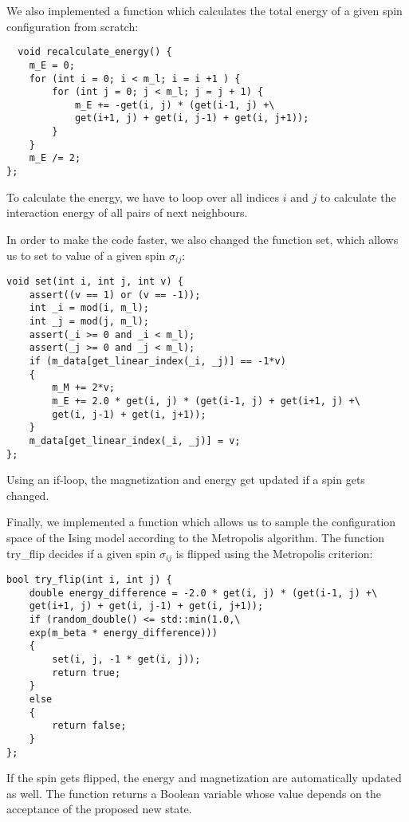 \documentclass[a4paper,10pt,bibtotoc]{scrartcl}
\begin{document}
We also implemented a function which calculates the total energy of a given spin configuration from scratch:
\begin{lstlisting}
  void recalculate_energy() {
    m_E = 0;
    for (int i = 0; i < m_l; i = i +1 ) {
        for (int j = 0; j < m_l; j = j + 1) {
            m_E += -get(i, j) * (get(i-1, j) +\
            get(i+1, j) + get(i, j-1) + get(i, j+1));
        }
    }
    m_E /= 2;
};
\end{lstlisting}
To calculate the energy, we have to loop over all indices $i$ and $j$ to calculate the interaction energy of all pairs of next neighbours.

In order to make the code faster, we also changed the function set, which allows us to set to value of a given spin $\sigma_{ij}$:
\begin{lstlisting}
void set(int i, int j, int v) {
    assert((v == 1) or (v == -1));
    int _i = mod(i, m_l);
    int _j = mod(j, m_l);
    assert(_i >= 0 and _i < m_l);
    assert(_j >= 0 and _j < m_l);
    if (m_data[get_linear_index(_i, _j)] == -1*v)
    {
        m_M += 2*v;
        m_E += 2.0 * get(i, j) * (get(i-1, j) + get(i+1, j) +\
        get(i, j-1) + get(i, j+1));
    }
    m_data[get_linear_index(_i, _j)] = v;
};
\end{lstlisting}
Using an if-loop, the magnetization and energy get updated if a spin gets changed.

Finally, we implemented a function which allows us to sample the configuration space of the Ising model according to the Metropolis algorithm. 
The function try\_flip decides if a given spin $\sigma_{ij}$ is flipped using the Metropolis criterion:
\begin{lstlisting}
bool try_flip(int i, int j) {
    double energy_difference = -2.0 * get(i, j) * (get(i-1, j) +\
    get(i+1, j) + get(i, j-1) + get(i, j+1));
    if (random_double() <= std::min(1.0,\
    exp(m_beta * energy_difference)))
    {
        set(i, j, -1 * get(i, j));
        return true;
    }
    else
    {
        return false;
    }
};
\end{lstlisting}
If the spin gets flipped, the energy and magnetization are automatically updated as well.
The function returns a Boolean variable whose value depends on the acceptance of the proposed new state.
\end{document}

